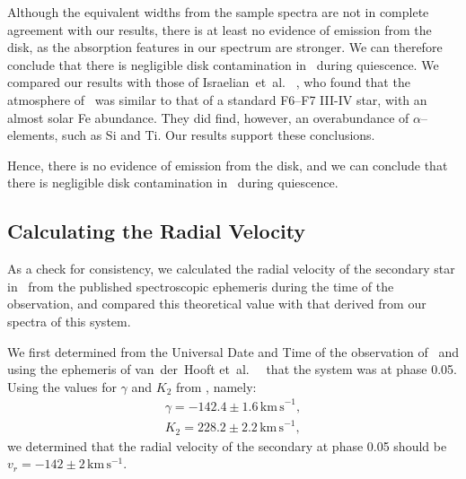 \vspace{\myparskip}

Although the equivalent widths from the sample spectra are not in
complete agreement with our results, there is at least no evidence of
emission from the disk, as the absorption features in our spectrum are
stronger. We can therefore conclude that there is negligible disk
contamination in \groj\ during quiescence. We compared our results with those of Israelian~et~al.\ %
\citeyear{Israelian_et_al.:1999}%
, who found that the atmosphere of \groj\ was similar to that of a standard F6--F7 III-IV star, with an almost solar Fe abundance. They did find, however, an overabundance of $\alpha$--elements, such as Si and Ti. Our results support these conclusions. %

\vspace{\myparskip}

Hence, there is no evidence of emission from the disk, and we can conclude that there is negligible disk contamination in \groj\ during quiescence. %


\subsection{Calculating the Radial Velocity}\label{cha:AccretionDiskContamination:sec:Spectroscopy:subsec:RadialVelocity}

As a check for consistency, we calculated the radial velocity of the
secondary star in \groj\ from the published spectroscopic ephemeris during the time of the observation, and compared
this theoretical value with that derived from our spectra of this
system. %

\vspace{\myparskip}

We first determined from the Universal Date and Time of
the observation of \groj\ and using the ephemeris of van~der~Hooft et~al.\ %
\citeyear{VanDerHooft_et_al.:1998}%
\ that the system was at phase 0.05. Using the values for $\gamma$ and
$K_2$ from %
%
, namely:
\begin{eqnarray}\label{cha:AccretionDiskContamination:sec:Spectroscopy:subsec:RadialVelocity:eqn:values}
\gamma = -142.4\pm1.6\,\mathrm{km\,s}^{-1},\\
K_2 = 228.2\pm2.2\,\mathrm{km\,s}^{-1},
\end{eqnarray}
we determined that the radial velocity of the secondary at phase
0.05 should be $v_r = -142\pm2\,\mathrm{km}\,\mathrm{s}^{-1}$. %

